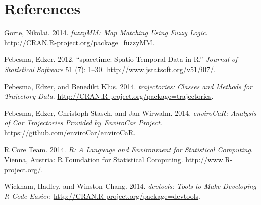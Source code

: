 \documentclass[]{article}
\begin{document}
\section*{References}\label{references}

Gorte, Nikolai. 2014. \emph{fuzzyMM: Map Matching Using Fuzzy Logic}.
\url{http://CRAN.R-project.org/package=fuzzyMM}.

Pebesma, Edzer. 2012. ``spacetime: Spatio-Temporal Data in R.''
\emph{Journal of Statistical Software} 51 (7): 1--30.
\url{http://www.jstatsoft.org/v51/i07/}.

Pebesma, Edzer, and Benedikt Klus. 2014. \emph{trajectories: Classes and
Methods for Trajectory Data}.
\url{http://CRAN.R-project.org/package=trajectories}.

Pebesma, Edzer, Christoph Stasch, and Jan Wirwahn. 2014.
\emph{enviroCaR: Analysis of Car Trajectories Provided by EnviroCar
Project}. \url{https://github.com/enviroCar/enviroCaR}.

R Core Team. 2014. \emph{R: A Language and Environment for Statistical
Computing}. Vienna, Austria: R Foundation for Statistical Computing.
\url{http://www.R-project.org/}.

Wickham, Hadley, and Winston Chang. 2014. \emph{devtools: Tools to Make
Developing R Code Easier}.
\url{http://CRAN.R-project.org/package=devtools}.
\end{document}
